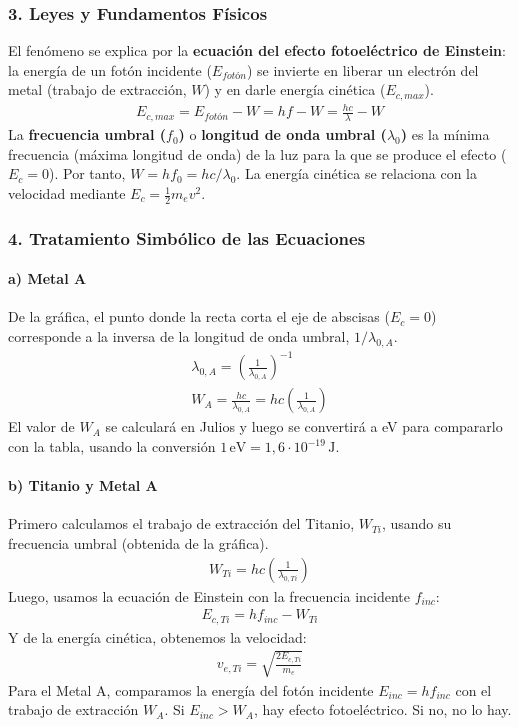 \subsubsection*{3. Leyes y Fundamentos Físicos}
El fenómeno se explica por la \textbf{ecuación del efecto fotoeléctrico de Einstein}: la energía de un fotón incidente ($E_{fotón}$) se invierte en liberar un electrón del metal (trabajo de extracción, $W$) y en darle energía cinética ($E_{c,max}$).
\begin{gather*}
    E_{c,max} = E_{fotón} - W = hf - W = \frac{hc}{\lambda} - W
\end{gather*}
La \textbf{frecuencia umbral ($f_0$)} o \textbf{longitud de onda umbral ($\lambda_0$)} es la mínima frecuencia (máxima longitud de onda) de la luz para la que se produce el efecto ($E_c=0$). Por tanto, $W = hf_0 = hc/\lambda_0$.
La energía cinética se relaciona con la velocidad mediante $E_c = \frac{1}{2}m_e v^2$.

\subsubsection*{4. Tratamiento Simbólico de las Ecuaciones}
\paragraph*{a) Metal A}
De la gráfica, el punto donde la recta corta el eje de abscisas ($E_c=0$) corresponde a la inversa de la longitud de onda umbral, $1/\lambda_{0,A}$.
\begin{gather}
    \lambda_{0,A} = \left(\frac{1}{\lambda_{0,A}}\right)^{-1} \\
    W_A = \frac{hc}{\lambda_{0,A}} = hc \left(\frac{1}{\lambda_{0,A}}\right)
\end{gather}
El valor de $W_A$ se calculará en Julios y luego se convertirá a eV para compararlo con la tabla, usando la conversión $1 \, \text{eV} = 1,6 \cdot 10^{-19} \, \text{J}$.

\paragraph*{b) Titanio y Metal A}
Primero calculamos el trabajo de extracción del Titanio, $W_{Ti}$, usando su frecuencia umbral (obtenida de la gráfica).
\begin{gather}
    W_{Ti} = hc \left(\frac{1}{\lambda_{0,Ti}}\right)
\end{gather}
Luego, usamos la ecuación de Einstein con la frecuencia incidente $f_{inc}$:
\begin{gather}
    E_{c,Ti} = h f_{inc} - W_{Ti}
\end{gather}
Y de la energía cinética, obtenemos la velocidad:
\begin{gather}
    v_{e,Ti} = \sqrt{\frac{2 E_{c,Ti}}{m_e}}
\end{gather}
Para el Metal A, comparamos la energía del fotón incidente $E_{inc} = hf_{inc}$ con el trabajo de extracción $W_A$. Si $E_{inc} > W_A$, hay efecto fotoeléctrico. Si no, no lo hay.

